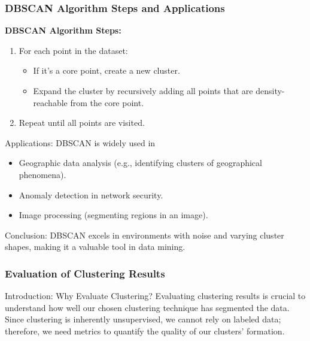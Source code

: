 \documentclass[aspectratio=169]{beamer}
\begin{document}
\begin{frame}[fragile]
    \frametitle{DBSCAN Algorithm Steps and Applications}
    \textbf{DBSCAN Algorithm Steps:}
    \begin{enumerate}
        \item For each point in the dataset:
        \begin{itemize}
            \item If it's a core point, create a new cluster.
            \item Expand the cluster by recursively adding all points that are density-reachable from the core point.
        \end{itemize}
        \item Repeat until all points are visited.
    \end{enumerate}

    \begin{block}{Applications:}
        DBSCAN is widely used in
        \begin{itemize}
            \item Geographic data analysis (e.g., identifying clusters of geographical phenomena).
            \item Anomaly detection in network security.
            \item Image processing (segmenting regions in an image).
        \end{itemize}
    \end{block}
    
    \begin{block}{Conclusion:}
        DBSCAN excels in environments with noise and varying cluster shapes, making it a valuable tool in data mining.
    \end{block}
\end{frame}

\begin{frame}[fragile]
    \frametitle{Evaluation of Clustering Results}
    \begin{block}{Introduction: Why Evaluate Clustering?}
    Evaluating clustering results is crucial to understand how well our chosen clustering technique has segmented the data. Since clustering is inherently unsupervised, we cannot rely on labeled data; therefore, we need metrics to quantify the quality of our clusters' formation.
    \end{block}
\end{frame}
\end{document}

